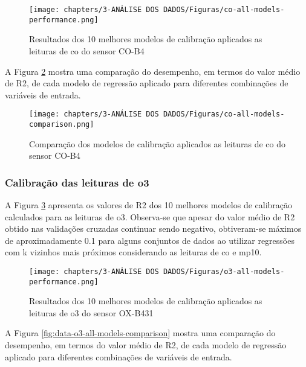 \begin{figure}[h]
    \centering
    \caption{Resultados dos 10 melhores modelos de calibração aplicados as leituras de \acrshort{co} do sensor CO-B4}
    \texttt{[image: chapters/3-ANÁLISE DOS DADOS/Figuras/co-all-models-performance.png]}
    \label{fig:data-co-all-models-performance}
\end{figure}

A Figura \ref{fig:data-co-all-models-comparison} mostra uma comparação do desempenho, em termos do valor médio de R2, de cada modelo de regressão aplicado para diferentes combinações de variáveis de entrada.

\begin{figure}[h]
    \centering
    \caption{Comparação dos modelos de calibração aplicados as leituras de \acrshort{co} do sensor CO-B4}
    \texttt{[image: chapters/3-ANÁLISE DOS DADOS/Figuras/co-all-models-comparison.png]}
    \label{fig:data-co-all-models-comparison}
\end{figure}

\subsubsection{Calibração das leituras de \acrshort{o3}}

A Figura \ref{fig:data-o3-all-models-performance} apresenta os valores de R2 dos 10 melhores modelos de calibração calculados para as leituras de \acrshort{o3}. Observa-se que apesar do valor médio de R2 obtido nas validações cruzadas continuar sendo negativo, obtiveram-se máximos de aproximadamente 0.1 para alguns conjuntos de dados ao utilizar regressões com k vizinhos mais próximos considerando as leituras de \acrshort{co} e \acrshort{mp10}.

\begin{figure}[h]
    \centering
    \caption{Resultados dos 10 melhores modelos de calibração aplicados as leituras de \acrshort{o3} do sensor OX-B431}
    \texttt{[image: chapters/3-ANÁLISE DOS DADOS/Figuras/o3-all-models-performance.png]}
    \label{fig:data-o3-all-models-performance}
\end{figure}

A Figura \ref{fig:data-o3-all-models-comparison} mostra uma comparação do desempenho, em termos do valor médio de R2, de cada modelo de regressão aplicado para diferentes combinações de variáveis de entrada.

